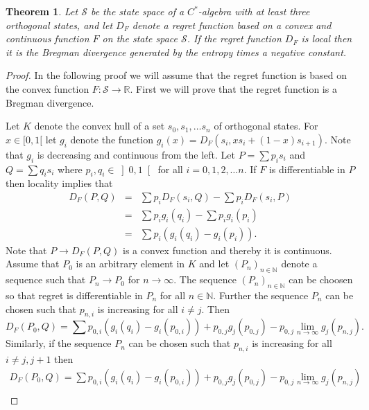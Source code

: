 \documentclass[10pt,a4paper,draft]{article}
\newtheorem{thm}{Theorem}
\begin{document}
\begin{thm}
Let $\mathcal{S}$ be the state space of a $C^*$-algebra with at least three orthogonal
states, and let $D_F$ denote a regret function based on a convex and continuous function $F$ on the state space ${\mathcal S}$.
If the regret function $D_{F}$ is local then it is the Bregman divergence generated by the entropy times a negative constant. 
\end{thm}
\begin{proof}
In the following proof we will assume that the regret function
is based on the convex function $F:\mathcal{S}\to\mathbb{R}.$  First we will prove that the regret function is a Bregman divergence.

Let $K$ denote the convex hull of a set $s_{0},s_{1},\dots
s_{n}$ of orthogonal states. For $x\in[0,1[$ let $g_{i}$ denote the function
$g_{i}\left(x\right)=D_{F}\left(s_{i},xs_{i}+\left(1-x\right)s_{i+1}\right)$.
Note that $g_{i}$ is decreasing and continuous from the left.
Let $P=\sum p_{i}s_{i}$ and $Q=\sum q_{i}s_{i}$ where $p_{i} , q_{i} \in\left] 0,1 \right[$ for all $i=0,1,2,\dots n$. If $F$ is
differentiable in $P$ then locality implies that 
\begin{eqnarray*}
D_{F}\left(P,Q\right) & = & \sum
p_{i}D_{F}\left(s_{i},Q\right)-\sum
p_{i}D_{F}\left(s_{i},P\right)\\
& = & \sum p_{i}g_{i}\left(q_{i}\right)-\sum
p_{i}g_{i}\left(p_{i}\right)\\
& = & \sum
p_{i}\left(g_{i}\left(q_{i}\right)-g_{i}\left(p_{i}\right)\right).
\end{eqnarray*}
Note that $P\to D_{F}\left(P,Q\right)$ is a convex function and
thereby it is continuous. Assume that $P_{0}$ is an arbitrary element in $K$ and let $\left(P_{n}\right)_{n\in\mathbb{N}}$ denote a sequence such that $P_{n}\to P_{0}$ for $n\to\infty.$ The sequence
$\left(P_{n}\right)_{n\in\mathbb{N}}$
can be choosen so that regret is differentiable in $P_{n}$ for
all $n\in\mathbb{N}.$ Further the sequence $P_{n}$ can be chosen
such that $p_{n,i}$ is increasing for all $i\neq j.$ Then 
\[
D_{F}\left(P_{0},Q\right)=\sum
p_{0,i}\left(g_{i}\left(q_{i}\right)-g_{i}\left(p_{0,i}\right)\right)+p_{0,j}g_{j}\left(p_{0,j}\right)-p_{0,j}\lim_{n\to\infty}g_{j}\left(p_{n,j}\right).
\]
Similarly, if the sequence $P_{n}$ can be chosen such that
$p_{n,i}$ is increasing for all $i\neq j,j+1$ then 
\begin{multline*}
D_{F}\left(P_{0},Q\right)=
\sum
p_{0,i}\left(g_{i}\left(q_{i}\right)-g_{i}\left(p_{0,i}\right)\right)+p_{0,j}g_{j}\left(p_{0,j}\right)-p_{0,j}\lim_{n\to\infty}g_{j}\left(p_{n,j}\right)\\

\end{multline*}
\end{proof}
\end{document}
